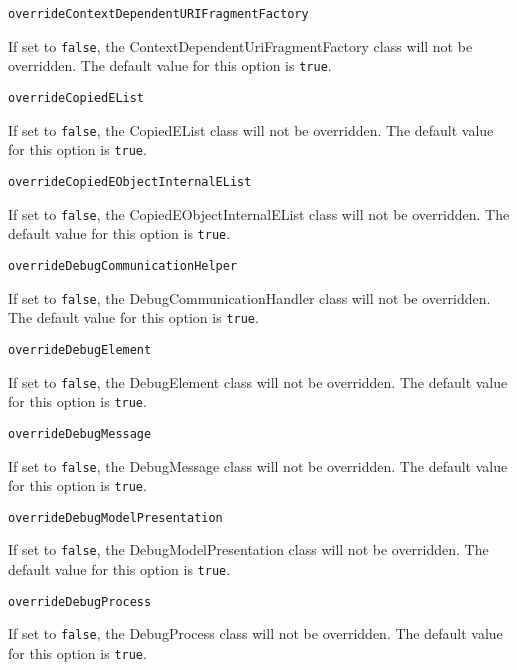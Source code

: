 \noindent\texttt{overrideContextDependentURIFragmentFactory}
\begin{myindentpar}{1cm}
If set to \texttt{false}, the ContextDependentUriFragmentFactory class will not be overridden. The default value for this option is \texttt{true}.
\end{myindentpar}

\noindent\texttt{overrideCopiedEList}
\begin{myindentpar}{1cm}
If set to \texttt{false}, the CopiedEList class will not be overridden. The default value for this option is \texttt{true}.
\end{myindentpar}

\noindent\texttt{overrideCopiedEObjectInternalEList}
\begin{myindentpar}{1cm}
If set to \texttt{false}, the CopiedEObjectInternalEList class will not be overridden. The default value for this option is \texttt{true}.
\end{myindentpar}

\noindent\texttt{overrideDebugCommunicationHelper}
\begin{myindentpar}{1cm}
If set to \texttt{false}, the DebugCommunicationHandler class will not be overridden. The default value for this option is \texttt{true}.
\end{myindentpar}

\noindent\texttt{overrideDebugElement}
\begin{myindentpar}{1cm}
If set to \texttt{false}, the DebugElement class will not be overridden. The default value for this option is \texttt{true}.
\end{myindentpar}

\noindent\texttt{overrideDebugMessage}
\begin{myindentpar}{1cm}
If set to \texttt{false}, the DebugMessage class will not be overridden. The default value for this option is \texttt{true}.
\end{myindentpar}

\noindent\texttt{overrideDebugModelPresentation}
\begin{myindentpar}{1cm}
If set to \texttt{false}, the DebugModelPresentation class will not be overridden. The default value for this option is \texttt{true}.
\end{myindentpar}

\noindent\texttt{overrideDebugProcess}
\begin{myindentpar}{1cm}
If set to \texttt{false}, the DebugProcess class will not be overridden. The default value for this option is \texttt{true}.
\end{myindentpar}

